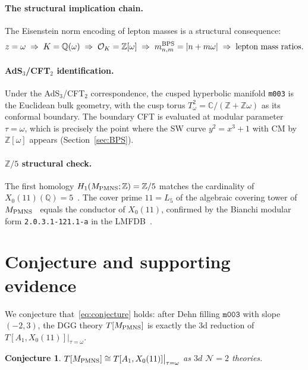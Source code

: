 \documentclass[11pt,a4paper]{article}
\newtheorem{conjecture}{Conjecture}
\theoremstyle{remark}
\newcommand{\mfld}[1]{\texttt{#1}}
\newcommand{\Z}{\mathbb{Z}}
\newcommand{\C}{\mathbb{C}}
\newcommand{\Q}{\mathbb{Q}}
\begin{document}
\paragraph{The structural implication chain.}
The Eisenstein norm encoding of lepton masses is a structural consequence:
\begin{equation}
z=\omega
\;\Rightarrow\;K=\Q(\omega)
\;\Rightarrow\;\mathcal{O}_K=\Z[\omega]
\;\Rightarrow\;m_{n,m}^{\rm BPS}=|n+m\omega|
\;\Rightarrow\;\text{lepton mass ratios.}
\end{equation}

\paragraph{AdS$_3$/CFT$_2$ identification.}
Under the AdS$_3$/CFT$_2$ correspondence, the cusped hyperbolic manifold
\mfld{m003} is the Euclidean bulk geometry, with the cusp torus
$T^2_\omega=\C/(\Z+\Z\omega)$ as its conformal boundary.
The boundary CFT is evaluated at modular parameter $\tau=\omega$,
which is precisely the point where the SW curve $y^2=x^3+1$ with
CM by $\Z[\omega]$ appears (Section~\ref{sec:BPS}).

\paragraph{$\Z/5$ structural check.}
The first homology $H_1(M_{\rm PMNS};\Z)=\Z/5$ matches the cardinality
of $X_0(11)(\Q)=5$~\cite{Silverman}.
The cover prime $11=L_5$ of the algebraic covering tower of
$M_{\rm PMNS}$~\cite{GentryFarey} equals the conductor of $X_0(11)$,
confirmed by the Bianchi modular form \texttt{2.0.3.1-121.1-a}
in the LMFDB~\cite{LMFDB}.

\section{Conjecture and supporting evidence}
\label{sec:classS}

We conjecture that~\eqref{eq:conjecture} holds: after Dehn filling
$\mfld{m003}$ with slope $(-2,3)$, the DGG theory $T[M_{\rm PMNS}]$
is exactly the 3d reduction of $T[A_1,X_0(11)]|_{\tau=\omega}$.

\begin{conjecture}
$T[M_{\rm PMNS}] \cong T[A_1,X_0(11)]\big|_{\tau=\omega}$
as $3d$ $\mathcal{N}=2$ theories.
\end{conjecture}
\end{document}
